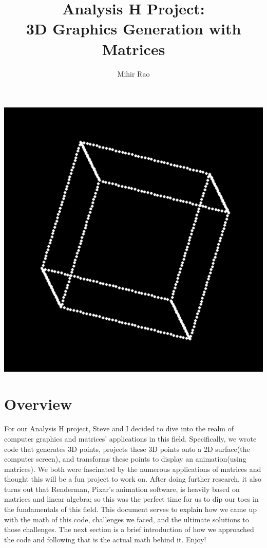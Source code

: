 \documentclass[14pt]{article}
\begin{document}
\title{Analysis H Project: \\ \textbf{3D Graphics Generation with Matrices}}
\author{Mihir Rao}
\maketitle

\begin{center}
	\vspace{3em}
	\includegraphics[scale=0.8]{titleImg}
	\vspace{3em}
\end{center}

\section*{Overview}

For our Analysis H project, Steve and I decided to dive into the realm of computer graphics and matrices' applications in this field. Specifically, we wrote code that generates 3D points, projects these 3D points onto a 2D surface(the computer screen), and transforms these points to display an animation(using matrices). We both were fascinated by the numerous applications of matrices and thought this will be a fun project to work on. After doing further research, it also turns out that Renderman, Pixar's animation software, is heavily based on matrices and linear algebra; so this was the perfect time for us to dip our toes in the fundamentals of this field. This document serves to explain how we came up with the math of this code, challenges we faced, and the ultimate solutions to those challenges. The next section is a brief introduction of how we approached the code and following that is the actual math behind it. Enjoy!
\end{document}
